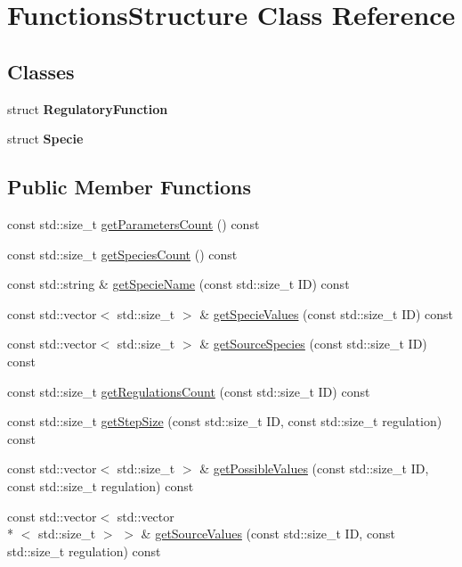 \hypertarget{class_functions_structure}{\section{Functions\-Structure Class Reference}
\label{class_functions_structure}
}
\subsection*{Classes}
\begin{DoxyCompactItemize}
\item 
struct {\bfseries Regulatory\-Function}
\item 
struct {\bfseries Specie}
\end{DoxyCompactItemize}
\subsection*{Public Member Functions}
\begin{DoxyCompactItemize}
\item 
const std\-::size\-\_\-t \hyperlink{class_functions_structure_a28881a5a6966780c8c6f8043efafd156}{get\-Parameters\-Count} () const 
\item 
const std\-::size\-\_\-t \hyperlink{class_functions_structure_ae769cef64b93f12919573e190c7092bc}{get\-Species\-Count} () const 
\item 
const std\-::string \& \hyperlink{class_functions_structure_ab0123c108d5c6eeb216fe2c3fa40ab99}{get\-Specie\-Name} (const std\-::size\-\_\-t I\-D) const 
\item 
const std\-::vector$<$ std\-::size\-\_\-t $>$ \& \hyperlink{class_functions_structure_a8b76e1ec8b8b73ed181deeab7b0e3fc6}{get\-Specie\-Values} (const std\-::size\-\_\-t I\-D) const 
\item 
const std\-::vector$<$ std\-::size\-\_\-t $>$ \& \hyperlink{class_functions_structure_a0cebc18347c7af8b74fa67d913ae8725}{get\-Source\-Species} (const std\-::size\-\_\-t I\-D) const 
\item 
const std\-::size\-\_\-t \hyperlink{class_functions_structure_acfb3fd20bf7109b99af6293fb010d03b}{get\-Regulations\-Count} (const std\-::size\-\_\-t I\-D) const 
\item 
const std\-::size\-\_\-t \hyperlink{class_functions_structure_a454b2fe905ff5d28c60a35d2b9b81568}{get\-Step\-Size} (const std\-::size\-\_\-t I\-D, const std\-::size\-\_\-t regulation) const 
\item 
const std\-::vector$<$ std\-::size\-\_\-t $>$ \& \hyperlink{class_functions_structure_aec80b4ccdbf5b8e2bafc1c43d287eab3}{get\-Possible\-Values} (const std\-::size\-\_\-t I\-D, const std\-::size\-\_\-t regulation) const 
\item 
const std\-::vector$<$ std\-::vector\\*
$<$ std\-::size\-\_\-t $>$ $>$ \& \hyperlink{class_functions_structure_ad7be1f6346d3d0cea52aeca091635e75}{get\-Source\-Values} (const std\-::size\-\_\-t I\-D, const std\-::size\-\_\-t regulation) const 
\end{DoxyCompactItemize}
